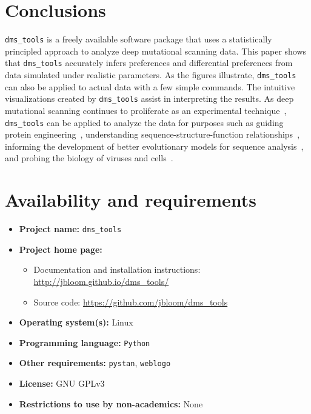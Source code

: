 \documentclass[twocolumn]{bmcart}%
\begin{document}
\section*{Conclusions}
\texttt{dms\_tools} is a freely available software package that uses a statistically principled approach to analyze deep mutational scanning data. This paper shows that \texttt{dms\_tools} accurately infers preferences and differential preferences from data simulated under realistic parameters. As the figures illustrate, \texttt{dms\_tools} can also be applied to actual data with a few simple commands. The intuitive visualizations created by \texttt{dms\_tools} assist in interpreting the results. As deep mutational scanning continues to proliferate as an experimental technique~\cite{fowler2014deep}, \texttt{dms\_tools} can be applied to analyze the data for purposes such as guiding protein engineering~\cite{traxlmayr2012construction,melnikov2014comprehensive}, understanding sequence-structure-function relationships~\cite{mclaughlin2012spatial,starita2013activity,roscoe2013analyses,olson2014comprehensive,araya2012fundamental}, informing the development of better evolutionary models for sequence analysis~\cite{bloom2014experimentally,bloom2014informed}, and probing the biology of viruses and cells~\cite{melamed2013deep,firnberg2014comprehensive,thyagarajan2014inherent,wu2014high,wu2014ns,findlay2014saturation}.

\section*{Availability and requirements}
\begin{itemize}
\item {\bf Project name:} \texttt{dms\_tools}
\item {\bf Project home page:}
\begin{itemize} 
\item Documentation and installation instructions: \url{http://jbloom.github.io/dms_tools/} 
\item Source code: \url{https://github.com/jbloom/dms_tools} 
\end{itemize}
\item {\bf Operating system(s):} Linux
\item {\bf Programming language:} \texttt{Python}
\item {\bf Other requirements:} \texttt{pystan}, \texttt{weblogo}
\item {\bf License:} GNU GPLv3
\item {\bf Restrictions to use by non-academics:} None
\end{itemize}
\end{document}
